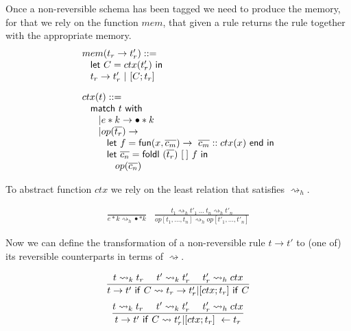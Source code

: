 \documentclass{article}[12pt,a4paper]
\theoremstyle{definition}
\begin{document}
Once a non-reversible schema has been tagged we need to produce the memory, for
that we rely on the function $mem$, that given a rule returns the rule together
with the appropriate memory.
\[
  \begin{array}{l}
  \begin{array}{l}
    mem(t_r \rightarrow t'_r) ::=\\
    \hspace{2ex}\mathsf{let}~C=ctx(t'_r)~\mathsf{in}\\
    \hspace{2ex}t_r \rightarrow t'_r~|~[C;t_r]
  \end{array}\\[5ex]
  
  \begin{array}{l}
    ctx(t)::=\\
    \hspace{2ex}\mathsf{match}~t~\mathsf{with}\\
    \hspace{4ex}| e*k \rightarrow \bullet * k\\
    \hspace{4ex}| op(\overline{t_r}) \rightarrow \\
    \hspace{6ex} \mathsf{let}~f=\mathsf{fun}(x,\overline{c_m})\rightarrow~\overline{c_m}::ctx(x)~\mathsf{end}~\mathsf{in}\\
    \hspace{6ex}\mathsf{let}~\overline{c_n} =
    \mathsf{foldl}~(\overline{t_r})~[\:]~f~\mathsf{in}\\
    \hspace{8ex} op(\overline{c_n})
  \end{array}
  \end{array}
\]

To abstract function $ctx$ we rely on the least relation that satisfies
$\rightsquigarrow_h$.

\[
  \begin{array}{ll}
    \displaystyle
    \frac{}
    { e * k \rightsquigarrow_h \bullet * k }
    &
      \displaystyle
      \frac{t_1 \rightsquigarrow_h t'_1~\ldots~t_n\rightsquigarrow_h t'_n}
      { op[t_1,\ldots,t_n] \rightsquigarrow_h op[t'_1,\ldots,t'_n] }
  \end{array}
\]

Now we can define the transformation of a non-reversible rule $t\rightarrow t'$
to (one of) its reversible counterparts in terms of
$\rightsquigarrow$.

\[
  \frac{t\rightsquigarrow_k t_r~~~~t'\rightsquigarrow_k t'_r~~~~t'_r\rightsquigarrow_h ctx}{
    t\rightarrow t'~\mathsf{if}~C \rightsquigarrow t_r \rightarrow t'_r|[ctx;
    t_r]~\mathsf{if}~C
  }
\]
\[
  \frac{t\rightsquigarrow_k t_r~~~~t'\rightsquigarrow_k t'_r~~~~t'_r\rightsquigarrow_h ctx}{
    t\rightarrow t'~\mathsf{if}~C \rightsquigarrow t'_r|[ctx;
    t_r]~\leftarrow t_r 
  }
\]
\end{document}
